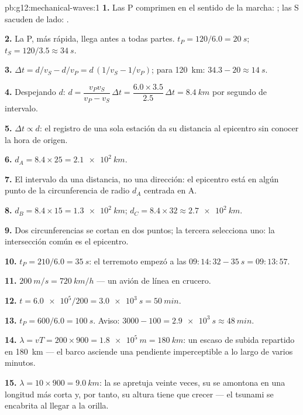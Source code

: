 \begin{solution}{pb:g12:mechanical-waves:1}
\textbf{1.} Las P comprimen en el sentido de la marcha: ;
las S sacuden de lado: .

\textbf{2.} La P, más rápida, llega antes a todas partes.
$t_P = 120/6.0 = \qty{20}{s}$; $t_S = 120/3.5 \approx \qty{34}{s}$.

\textbf{3.} $\Delta t = d/v_S - d/v_P = d\,(1/v_S - 1/v_P)$; para
\qty{120}{km}: $34.3 - 20 \approx \qty{14}{s}$.

\textbf{4.} Despejando $d$:
$d = \dfrac{v_P v_S}{v_P - v_S}\,\Delta t
= \dfrac{6.0 \times 3.5}{2.5}\,\Delta t = \qty{8.4}{km}$ por segundo de
intervalo.

\textbf{5.} $\Delta t \propto d$: el registro de una sola estación da su
distancia al epicentro sin conocer la hora de origen.

\textbf{6.} $d_A = 8.4 \times 25 = \qty{2.1e2}{km}$.

\textbf{7.} El intervalo da una distancia, no una dirección: el
epicentro está en algún punto de la circunferencia de radio $d_A$
centrada en A.

\textbf{8.} $d_B = 8.4 \times 15 = \qty{1.3e2}{km}$;
$d_C = 8.4 \times 32 \approx \qty{2.7e2}{km}$.

\textbf{9.} Dos circunferencias se cortan en dos puntos; la tercera
selecciona uno: la intersección común es el epicentro.

\textbf{10.} $t_P = 210/6.0 = \qty{35}{s}$: el terremoto empezó a las
$09{:}14{:}32 - \qty{35}{s} = 09{:}13{:}57$.

\textbf{11.} $\qty{200}{m/s} = \qty{720}{km/h}$ --- un avión de línea en
crucero.

\textbf{12.} $t = \num{6.0e5}/200 = \qty{3.0e3}{s} = \qty{50}{min}$.

\textbf{13.} $t_P = 600/6.0 = \qty{100}{s}$. Aviso:
$3000 - 100 = \qty{2.9e3}{s} \approx \qty{48}{min}$.

\textbf{14.} $\lambda = vT = 200 \times 900 = \qty{1.8e5}{m} =
\qty{180}{km}$: un  escaso de subida repartido en \qty{180}{km}
--- el barco asciende una pendiente imperceptible a lo largo de varios
minutos.

\textbf{15.} $\lambda = 10 \times 900 = \qty{9.0}{km}$: la  se
apretuja veinte veces, su  se amontona en una longitud más corta
y, por tanto, su altura tiene que crecer --- el tsunami se encabrita al
llegar a la orilla.


\end{solution}
